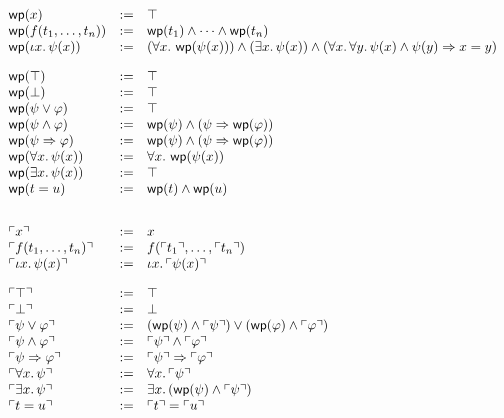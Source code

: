 \documentclass[11pt]{article}
\begin{document}
\[
\begin{array}{lll}
  \mathop{\mathsf{wp}}(x) & := & \top\\
  \mathop{\mathsf{wp}}(f({t}_1,\ldots,{t}_{n})) & := & \mathop{\mathsf{wp}}(t_1) \wedge \cdots \wedge \mathop{\mathsf{wp}}(t_n)\\
  \mathop{\mathsf{wp}}(\iota x.\, \psi(x)) & := &
       (\forall x.\, \mathop{\mathsf{wp}}(\psi(x))) \wedge
       (\exists x.\, \psi(x)) \wedge
       (\forall x.\, \forall y.\, \psi(x) \wedge \psi(y) \Rightarrow x=y)\\[10pt]

  \mathop{\mathsf{wp}}(\top) & := & \top\\
  \mathop{\mathsf{wp}}(\bot) & := & \top\\
  \mathop{\mathsf{wp}}(\psi \vee \varphi) & := & \top\\
  \mathop{\mathsf{wp}}(\psi \wedge \varphi) & := & \mathop{\mathsf{wp}}(\psi) \wedge (\psi \Rightarrow \mathop{\mathsf{wp}}(\varphi))\\
  \mathop{\mathsf{wp}}(\psi \Rightarrow \varphi) & := & \mathop{\mathsf{wp}}(\psi) \wedge (\psi \Rightarrow \mathop{\mathsf{wp}}(\varphi))\\
  \mathop{\mathsf{wp}}(\forall x.\, \psi(x)) & := & \forall x.\, \mathop{\mathsf{wp}}(\psi(x))\\
  \mathop{\mathsf{wp}}(\exists x.\, \psi(x)) & := & \top\\
  \mathop{\mathsf{wp}}(t = u) & := & \mathop{\mathsf{wp}}(t) \wedge \mathop{\mathsf{wp}}(u)\\[20pt]
  
  \ulcorner x \urcorner & := & x\\
  \ulcorner f({t}_1,\ldots,{t}_{n}) \urcorner & := & f(\ulcorner t_1 \urcorner,\ldots,\ulcorner t_n \urcorner)\\
  \ulcorner \iota x.\, \psi(x) \urcorner & := & \iota x.\, \ulcorner \psi(x) \urcorner\\[10pt]
  
  \ulcorner \top \urcorner & := & \top\\
  \ulcorner \bot \urcorner & := & \bot\\
  \ulcorner \psi \vee \varphi \urcorner & := & (\mathop{\mathsf{wp}}(\psi) \wedge \ulcorner \psi \urcorner) \vee (\mathop{\mathsf{wp}}(\varphi) \wedge \ulcorner \varphi \urcorner)\\
  \ulcorner \psi \wedge \varphi \urcorner & := & \ulcorner \psi \urcorner \wedge \ulcorner \varphi \urcorner\\
  \ulcorner \psi \Rightarrow \varphi \urcorner & := & \ulcorner \psi \urcorner \Rightarrow \ulcorner \varphi \urcorner\\
  \ulcorner \forall x.\, \psi \urcorner & := & \forall x.\, \ulcorner \psi \urcorner \\
  \ulcorner \exists x.\, \psi \urcorner & := & \exists x.\, (\mathop{\mathsf{wp}}(\psi) \wedge \ulcorner \psi \urcorner)\\
  \ulcorner t = u \urcorner & := & \ulcorner t \urcorner = \ulcorner u \urcorner\\
\end{array}
\]
\end{document}
